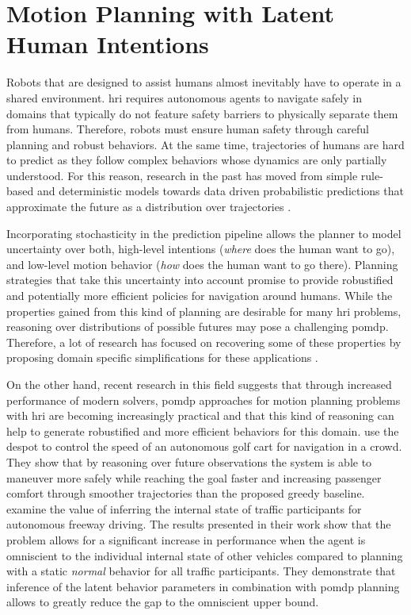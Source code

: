 \chapter{Motion Planning with Latent Human Intentions}\label{chap:hri}

Robots that are designed to assist humans almost inevitably have to operate in
a shared environment. \ac{hri} requires autonomous agents to navigate
safely in domains that typically do not feature safety barriers to physically
separate them from humans. Therefore, robots must ensure human safety through
careful planning and robust behaviors. At the same time, trajectories of humans
are hard to predict as they follow complex behaviors whose dynamics are only
partially understood. For this reason, research in the past has moved from
simple rule-based and deterministic models
\cite{helbing1995social,burstedde2001simulation} towards data driven
probabilistic predictions that approximate the future as a distribution over
trajectories \cite{kretzschmar2014learning,alahi2016social,gupta2018social}.


Incorporating stochasticity in the prediction pipeline allows the planner to
model uncertainty over both, high-level intentions (\eg \emph{where} does the
human want to go), and low-level motion behavior (\eg \emph{how} does the
human want to go there). Planning strategies that take this uncertainty into
account promise to provide robustified and potentially more efficient policies
for navigation around humans. While the properties gained from this kind of
planning are desirable for many \ac{hri} problems, reasoning over distributions
of possible futures may pose a challenging \ac{pomdp}. Therefore, a lot of
research has focused on recovering some of these properties by proposing domain
specific simplifications for these applications \cite{fern2007decision,
sadigh2016information, javdani2018shared, fisac2018probabilistically}.

On the other hand, recent research in this field suggests that through
increased performance of modern solvers, \ac{pomdp} approaches for motion
planning problems with \ac{hri} are becoming increasingly practical and that
this kind of reasoning can help to generate robustified and more efficient
behaviors for this domain. \cite{bai2015intention} use the \ac{despot} to
control the speed of an autonomous golf cart for navigation in a crowd. They
show that by reasoning over future observations the system is able to maneuver
more safely while reaching the goal faster and increasing passenger comfort
through smoother trajectories than the proposed greedy baseline.
\cite{sunberg2017value} examine the value of inferring the internal state of
traffic participants for autonomous freeway driving. The results presented in
their work show that the problem allows for a significant increase in
performance when the agent is omniscient to the individual internal state of
other vehicles compared to planning with a static \emph{normal} behavior for
all traffic participants. They demonstrate that inference of the latent
behavior parameters in combination with \ac{pomdp} planning allows to greatly
reduce the gap to the omniscient upper bound.

